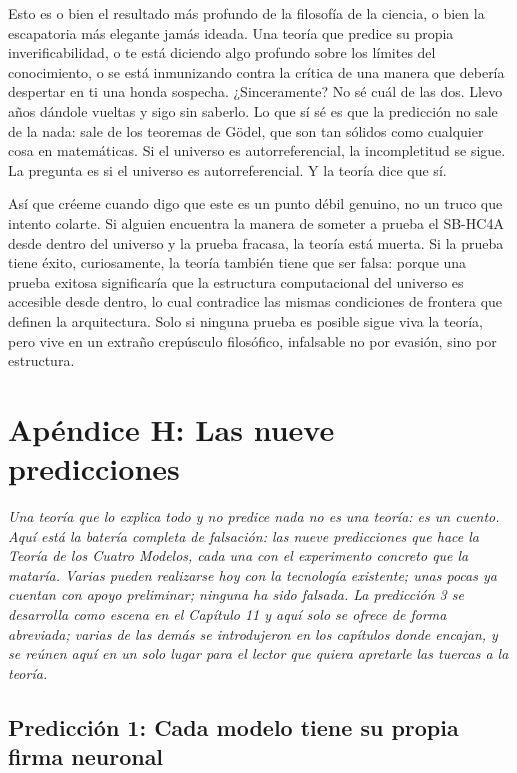 \documentclass[11pt, twoside, openright]{book}
\begin{document}
Esto es o bien el resultado más profundo de la filosofía de la ciencia, o bien la escapatoria más elegante jamás ideada. Una teoría que predice su propia inverificabilidad, o te está diciendo algo profundo sobre los límites del conocimiento, o se está inmunizando contra la crítica de una manera que debería despertar en ti una honda sospecha. ¿Sinceramente? No sé cuál de las dos. Llevo años dándole vueltas y sigo sin saberlo. Lo que sí sé es que la predicción no sale de la nada: sale de los teoremas de Gödel, que son tan sólidos como cualquier cosa en matemáticas. Si el universo es autorreferencial, la incompletitud se sigue. La pregunta es si el universo es autorreferencial. Y la teoría dice que sí.

Así que créeme cuando digo que este es un punto débil genuino, no un truco que intento colarte. Si alguien encuentra la manera de someter a prueba el SB-HC4A desde dentro del universo y la prueba fracasa, la teoría está muerta. Si la prueba tiene éxito, curiosamente, la teoría también tiene que ser falsa: porque una prueba exitosa significaría que la estructura computacional del universo es accesible desde dentro, lo cual contradice las mismas condiciones de frontera que definen la arquitectura. Solo si ninguna prueba es posible sigue viva la teoría, pero vive en un extraño crepúsculo filosófico, infalsable no por evasión, sino por estructura.


\chapter*{Apéndice H: Las nueve predicciones}

\textit{Una teoría que lo explica todo y no predice nada no es una teoría: es un cuento. Aquí está la batería completa de falsación: las nueve predicciones que hace la Teoría de los Cuatro Modelos, cada una con el experimento concreto que la mataría. Varias pueden realizarse hoy con la tecnología existente; unas pocas ya cuentan con apoyo preliminar; ninguna ha sido falsada. La predicción 3 se desarrolla como escena en el Capítulo 11 y aquí solo se ofrece de forma abreviada; varias de las demás se introdujeron en los capítulos donde encajan, y se reúnen aquí en un solo lugar para el lector que quiera apretarle las tuercas a la teoría.}

\section*{Predicción 1: Cada modelo tiene su propia firma neuronal}
\end{document}
